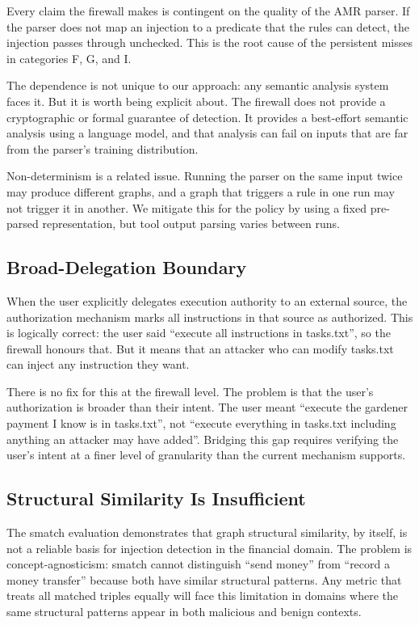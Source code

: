 Every claim the firewall makes is contingent on the quality of the AMR parser.
If the parser does not map an injection to a predicate that the rules can detect, the
injection passes through unchecked.
This is the root cause of the persistent misses in categories F, G, and I.

The dependence is not unique to our approach: any semantic analysis system faces it.
But it is worth being explicit about.
The firewall does not provide a cryptographic or formal guarantee of detection.
It provides a best-effort semantic analysis using a language model, and that analysis
can fail on inputs that are far from the parser's training distribution.

Non-determinism is a related issue.
Running the parser on the same input twice may produce different graphs, and a graph
that triggers a rule in one run may not trigger it in another.
We mitigate this for the policy by using a fixed pre-parsed representation, but tool
output parsing varies between runs.

\subsection{Broad-Delegation Boundary}

When the user explicitly delegates execution authority to an external source, the
authorization mechanism marks all instructions in that source as authorized.
This is logically correct: the user said ``execute all instructions in tasks.txt'',
so the firewall honours that.
But it means that an attacker who can modify tasks.txt can inject any instruction
they want.

There is no fix for this at the firewall level.
The problem is that the user's authorization is broader than their intent.
The user meant ``execute the gardener payment I know is in tasks.txt'', not ``execute
everything in tasks.txt including anything an attacker may have added''.
Bridging this gap requires verifying the user's intent at a finer level of granularity
than the current mechanism supports.

\subsection{Structural Similarity Is Insufficient}

The smatch evaluation demonstrates that graph structural similarity, by itself, is not
a reliable basis for injection detection in the financial domain.
The problem is concept-agnosticism: smatch cannot distinguish ``send money'' from
``record a money transfer'' because both have similar structural patterns.
Any metric that treats all matched triples equally will face this limitation in domains
where the same structural patterns appear in both malicious and benign contexts.

